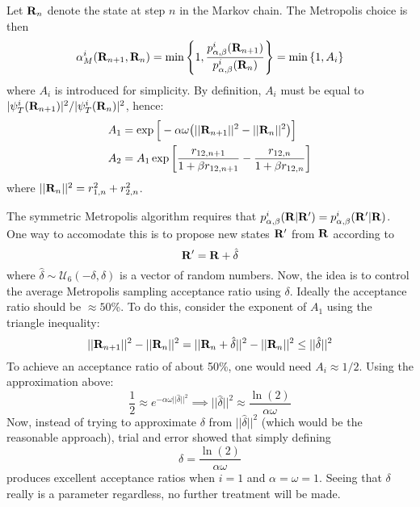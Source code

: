 \documentclass[nofootinbib,reprint,english]{revtex4-1}
\begin{document}
Let \(\vb{R}_n\) denote the state at step \(n\) in the Markov chain. The Metropolis choice is then
\begin{equation*}
\alpha_M^i(\vb{R}_{n+1},\vb{R}_n)=\min\left\lbrace1,\frac{p_{\alpha,\beta}^i(\vb{R}_{n+1})}{p_{\alpha,\beta}^i(\vb{R}_n)}\right\rbrace=\min\left\lbrace1,A_i\right\rbrace
\end{equation*}
where \(A_i\) is introduced for simplicity. By definition, \(A_i\) must be equal to \(|\psi_T^i(\vb{R}_{n+1})|^2/|\psi_T^i(\vb{R}_n)|^2\), hence:
\begin{subequations}\label{eq:VMC_probability_ratios}
\begin{align}
A_1&=\exp\Big[-\alpha\omega\big(||\vb{R}_{n+1}||^2-||\vb{R}_n||^2\big)\Big]\\
A_2&=A_1\exp\bigg[\frac{r_{12,n+1}}{1+\beta r_{12,n+1}}-\frac{r_{12,n}}{1+\beta r_{12,n}}\bigg]
\end{align}
\end{subequations}
where \(||\vb{R}_n||^2=r_{1,n}^2+r_{2,n}^2\).

The symmetric Metropolis algorithm requires that \(p_{\alpha,\beta}^i(\vb{R}|\vb{R}')=p_{\alpha,\beta}^i(\vb{R}'|\vb{R})\). One way to accomodate this is to propose new states \(\vb{R}'\) from \(\vb{R}\) according to
\begin{equation}
\vb{R}'=\vb{R}+\hat{\delta}
\end{equation}
where \(\hat{\delta}\sim\mathcal{U}_6(-\delta,\delta)\) is a vector of random numbers. Now, the idea is to control the average Metropolis sampling acceptance ratio using \(\delta\). Ideally the acceptance ratio should be \(\approx50\)\%. To do this, consider the exponent of \(A_1\) using the triangle inequality:
\[||\vb{R}_{n+1}||^2-||\vb{R}_n||^2=||\vb{R}_n+\hat{\delta}||^2-||\vb{R}_n||^2\leq||\hat{\delta}||^2\]
To achieve an acceptance ratio of about 50\%, one would need \(A_i\approx1/2\). Using the approximation above:
\[\frac{1}{2}\approx e^{-\alpha\omega||\hat{\delta}||^2}\implies||\hat{\delta}||^2\approx\frac{\ln(2)}{\alpha\omega}\]
Now, instead of trying to approximate \(\delta\) from \(||\hat{\delta}||^2\) (which would be the reasonable approach), trial and error showed that simply defining
\begin{equation}
\delta=\frac{\ln(2)}{\alpha\omega}
\end{equation}
produces excellent acceptance ratios when \(i=1\) and \(\alpha=\omega=1\). Seeing that \(\delta\) really is a parameter regardless, no further treatment will be made.
\end{document}
